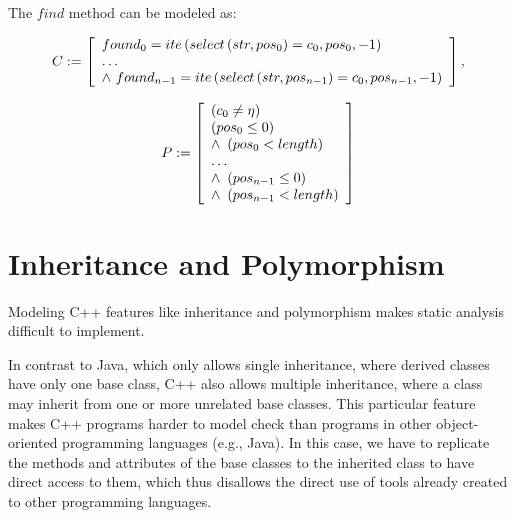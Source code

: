 \documentclass[a4paper]{llncs}
\newcommand{\comment}[1]{}
\begin{document}
{The $find$ method can be modeled as:

\begin{equation}
\label{cfind-string}
C := \left [ \begin{array}{ll}
              found_{0} = ite\left(select\left(str, pos_{0}\right) = c_{0}, pos_{0}, -1\right)\\
              \ldots \\
               \wedge \, \, found_{n-1} = ite\left(select\left(str, pos_{n-1}\right) = c_{0}, pos_{n-1}, -1\right)\\
              \end{array} \right ],  \\
\nonumber
\end{equation}

\begin{equation}
\label{cfind-string-p}
P := \left [ \begin{array}{ll}
				 \left(c_{0} \neq \eta\right) \\
	       \left(pos_{0} \leq 0\right) \\
         \wedge \, \, \left(pos_{0} < length\right)\\
	       \ldots \\
	       \wedge \, \, \left(pos_{n-1} \leq 0\right)\\
	       \wedge \, \, \left(pos_{n-1} < length\right)\\

              \end{array} \right ]  \\
\end{equation}
}
\section{Inheritance and Polymorphism}
\label{inheritance-and-polymorphism}

Modeling C++ features like inheritance and polymorphism
makes static analysis difficult to implement.
\comment{
Inheritance is one of the main benefits of object-oriented paradigm,
which allows a class (derived class) absorbs data and behavior
from existing classes (base class) and thus enhances it with new features.
This is the vital concept behind the creation of reusable software components
and has received much attention because it is one of the promising ways to
improve software quality.}
In contrast to Java, which only allows single inheritance, where derived classes have only one base
class, C++ also allows multiple inheritance, where a class may inherit from one
or more unrelated base classes. This particular feature makes C++ programs
harder to model check than programs in other object-oriented programming
languages (e.g., Java). In this case, we have to replicate the methods and attributes of the base
classes to the inherited class to have direct access to them,
which thus disallows the direct use of tools already created
to other programming languages.
\end{document}
